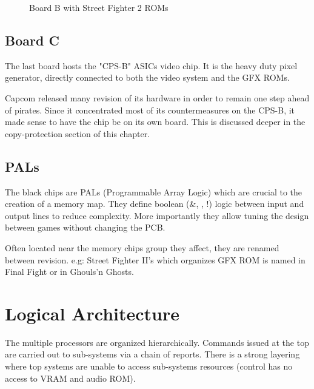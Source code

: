 \vfill
\begin{figure}[H]
  \caption*{Board B with Street Fighter 2 ROMs}
  \end{figure}







\subsection{Board C}
The last board hosts the "CPS-B" ASICs video chip. It is the heavy duty pixel generator, directly connected to both the video system and the GFX ROMs.

Capcom released many revision of its hardware in order to remain one step ahead of pirates. Since it concentrated most of its countermeasures on the CPS-B, it made sense to have the chip be on its own board. This is discussed deeper in the copy-protection section of this chapter.

\begin{minipage}[t]{0.49\linewidth}
\end{minipage}%
\hfill%
\begin{minipage}[t]{0.49\linewidth}
\end{minipage}

\subsection{PALs}
The black chips are PALs (Programmable Array Logic) which are crucial to the creation of a memory map. They define boolean (\&, \textbar, !) logic between input and output lines to reduce complexity. More importantly they allow tuning the design between games without changing the PCB.


 Often located near the memory chips group they affect, they are renamed between revision. e.g: Street Fighter II's  which organizes GFX ROM is named  in Final Fight or  in Ghouls'n Ghosts.



\section{Logical Architecture}
The multiple processors are organized hierarchically. Commands issued at the top are carried out to sub-systems via a chain of reports. There is a strong layering where top systems are unable to access sub-systems resources (control has no access to VRAM and audio ROM).

